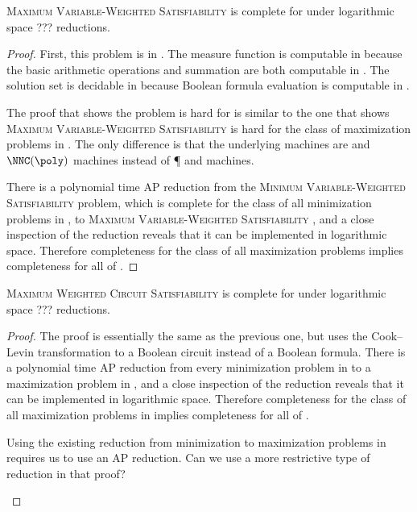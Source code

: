 \documentclass[]{article}
\begin{document}
\begin{theorem}
  \textsc{Maximum Variable-Weighted Satisfiability} is complete for \NNCO{} under logarithmic space ??? reductions.
\end{theorem}
\begin{proof}
  First, this problem is in \NNCO.
  The measure function is computable in \FNC{} because the basic arithmetic operations and summation are both computable in \FNC{}.
  The solution set is decidable in \NC{} because Boolean formula evaluation is computable in \NC{} \cite{buss87}.

  The proof that shows the problem is hard for \NNCO{} is similar to the one that shows \textsc{Maximum Variable-Weighted Satisfiability} is hard for the class of maximization problems in \NPO{} \cite[Theorem~3.1]{om87} \cite[Theorem~8.3]{acgkmp99}.
  The only difference is that the underlying machines are \NC{} and $\NNC(\poly)$ machines instead of \P{} and \NP{} machines.

  There is a polynomial time AP reduction from the \textsc{Minimum Variable-Weighted Satisfiability} problem, which is complete for the class of all minimization problems in \NNCO, to \textsc{Maximum Variable-Weighted Satisfiability} \cite[Theorem~8.4]{acgkmp99}, and a close inspection of the reduction reveals that it can be implemented in logarithmic space.
  Therefore completeness for the class of all maximization problems implies completeness for all of \NNCO.
\end{proof}

\begin{theorem}
  \textsc{Maximum Weighted Circuit Satisfiability} is complete for \NPO{} under logarithmic space ??? reductions.
\end{theorem}
\begin{proof}
  The proof is essentially the same as the previous one, but uses the Cook--Levin transformation to a Boolean circuit instead of a Boolean formula.
  There is a polynomial time AP reduction from every minimization problem in \NPO{} to a maximization problem in \NPO{} \cite[Theorem~8.4]{acgkmp99}, and a close inspection of the reduction reveals that it can be implemented in logarithmic space.
  Therefore completeness for the class of all maximization problems in \NPO{} implies completeness for all of \NPO.
  \begin{todo}
    Using the existing reduction from minimization to maximization problems in \NPO{} requires us to use an AP reduction.
    Can we use a more restrictive type of reduction in that proof?
  \end{todo}
\end{proof}
\end{document}
